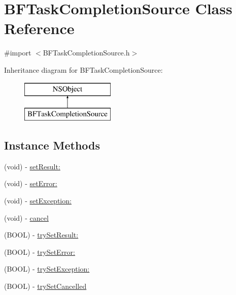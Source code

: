 \hypertarget{interface_b_f_task_completion_source}{}\section{B\+F\+Task\+Completion\+Source Class Reference}
\label{interface_b_f_task_completion_source}


{\ttfamily \#import $<$B\+F\+Task\+Completion\+Source.\+h$>$}

Inheritance diagram for B\+F\+Task\+Completion\+Source\+:\begin{figure}[H]
\begin{center}
\leavevmode
\includegraphics[height=2.000000cm]{interface_b_f_task_completion_source}
\end{center}
\end{figure}
\subsection*{Instance Methods}
\begin{DoxyCompactItemize}
\item 
(void) -\/ \hyperlink{interface_b_f_task_completion_source_abed0b58e2611f5775d1a373c02dd5f39}{set\+Result\+:}
\item 
(void) -\/ \hyperlink{interface_b_f_task_completion_source_a01b81813ac47e1f729bb2418102a987e}{set\+Error\+:}
\item 
(void) -\/ \hyperlink{interface_b_f_task_completion_source_a40755dcab284b5404bcb896a9e0f3ec7}{set\+Exception\+:}
\item 
(void) -\/ \hyperlink{interface_b_f_task_completion_source_a945538d5ef1ea6110ced6a7417955ec5}{cancel}
\item 
(B\+O\+O\+L) -\/ \hyperlink{interface_b_f_task_completion_source_ab083534e8cadd435953acc8572daf2f7}{try\+Set\+Result\+:}
\item 
(B\+O\+O\+L) -\/ \hyperlink{interface_b_f_task_completion_source_a65065b1c8dad949e4aea15c8c37b479e}{try\+Set\+Error\+:}
\item 
(B\+O\+O\+L) -\/ \hyperlink{interface_b_f_task_completion_source_acc07a13997407c9cdb6557917af5c85f}{try\+Set\+Exception\+:}
\item 
(B\+O\+O\+L) -\/ \hyperlink{interface_b_f_task_completion_source_ac243420ce687eba4233e38726459bb61}{try\+Set\+Cancelled}
\end{DoxyCompactItemize}
